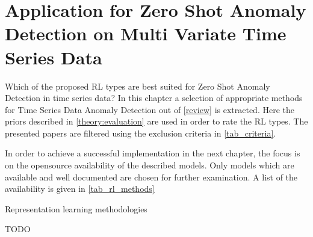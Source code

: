 \section{Application for Zero Shot Anomaly Detection on Multi Variate Time Series Data}\label{application}
 Which of the proposed RL types are best suited for Zero Shot Anomaly Detection in time series data? In this chapter a selection of appropriate methods for Time Series Data Anomaly Detection out of \ref{review} is extracted. Here the priors described in \ref{theory:evaluation} are used in order to rate the RL types. The presented papers are filtered using the exclusion criteria in \ref{tab_criteria}.

 In order to achieve a successful implementation in the next chapter, the focus is on the opensource availability of the described models. Only models which are available and well documented are chosen for further examination. A list of the availability is given in \ref{tab_rl_methods}
 \begin{table}
   \caption{Representation learning methodologies}\label{tab_rl_methods}
   
 \end{table}
TODO \cite{fung_model_2024}  %

